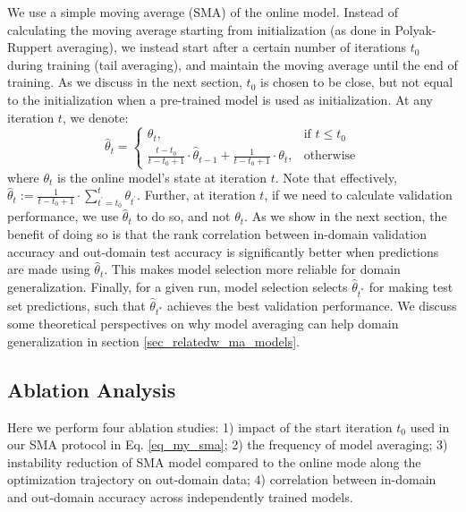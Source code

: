 \documentclass{article}
\begin{document}
We use a simple moving average (SMA) of the online model. Instead of calculating the moving average starting from initialization (as done in Polyak-Ruppert averaging), we instead start after a certain number of iterations $t_0$ during training (tail averaging), and maintain the moving average until the end of training. As we discuss in the next section, $t_0$ is chosen to be close, but not equal to the initialization when a pre-trained model is used as initialization. At any iteration $t$, we denote:
\begin{equation}
\label{eq_my_sma}
    \hat{\theta}_t = \begin{cases}
    \theta_{t},& \text{if } t\le t_0\\
    \frac{t-t_0}{t-t_0 +1} \cdot \hat{\theta}_{t-1} + \frac{1}{t-t_0 +1} \cdot \theta_{t},              & \text{otherwise}
\end{cases}
\end{equation}
where $\theta_t$ is the online model's state at iteration $t$. Note that effectively, $\hat{\theta}_t := \frac{1}{t-t_0+1}\cdot \sum_{t^\prime=t_0}^t {\theta}_{t^\prime}$. Further, at iteration $t$, if we need to calculate validation performance, we use $\hat{\theta}_t$ to do so, and not $\theta_{t}$. As we show in the next section, the benefit of doing so is that the rank correlation between in-domain validation accuracy and out-domain test accuracy is significantly better when predictions are made using $\hat{\theta}_t$. This makes model selection more reliable for domain generalization. Finally, for a given run, model selection selects $\hat{\theta}_{t^*}$ for making test set predictions, such that $\hat{\theta}_{t^*}$ achieves the best validation performance. We discuss some theoretical perspectives on why model averaging can help domain generalization in section \ref{sec_relatedw_ma_models}.

\subsection{Ablation Analysis}
\label{sec_ma_analysis}

Here we perform four ablation studies: 1) impact of the start iteration $t_0$ used in our SMA protocol in Eq. \ref{eq_my_sma}; 2) the frequency of model averaging; 3) instability reduction of SMA model compared to the online mode along the optimization trajectory on out-domain data; 4) correlation between in-domain and out-domain accuracy across independently trained models. 
\end{document}
